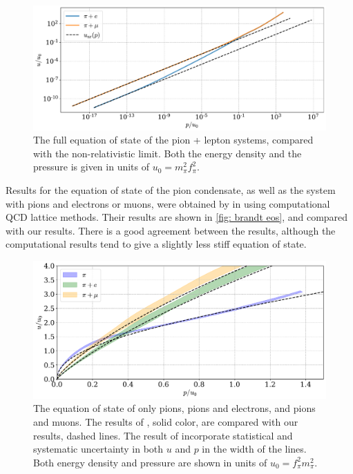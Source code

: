 \begin{figure}[!htb]
    \centering
    \includegraphics[width=\textwidth]{../scripts/figurer/charge_neutrality/eos_lim.pdf}
    \caption{
        The full equation of state of the pion + lepton systems, compared with the non-relativistic limit.
        Both the energy density and the pressure is given in units of $u_0 = m_\pi^2 f_\pi^2$.
    }
    \label{fig: lepton eos limit}
\end{figure}


Results for the equation of state of the pion condensate, as well as the system with pions and electrons or muons, were obtained by \citeauthor{brandtNewClassCompact2018} in \autocite{brandtNewClassCompact2018} using computational QCD lattice methods.
Their results are shown in \autoref{fig: brandt eos}, and compared with our results.
There is a good agreement between the results, although the computational results tend to give a slightly less stiff equation of state.

\begin{figure}[!htb]
    \centering
    \includegraphics[width=\textwidth]{../scripts/figurer/brandt_eos.pdf}
    \caption{
        The equation of state of only pions, pions and electrons, and pions and muons.
        The results of \citeauthor{brandtNewClassCompact2018}, solid color, are compared with our results, dashed lines.
        The result of \citeauthor{brandtNewClassCompact2018} incorporate statistical and systematic uncertainty in both $u$ and $p$ in the width of the lines.
        Both energy density and pressure are shown in units of $u_0 = f_\pi^2 m_\pi^2$.
    }
    \label{fig: brandt eos}
\end{figure}




